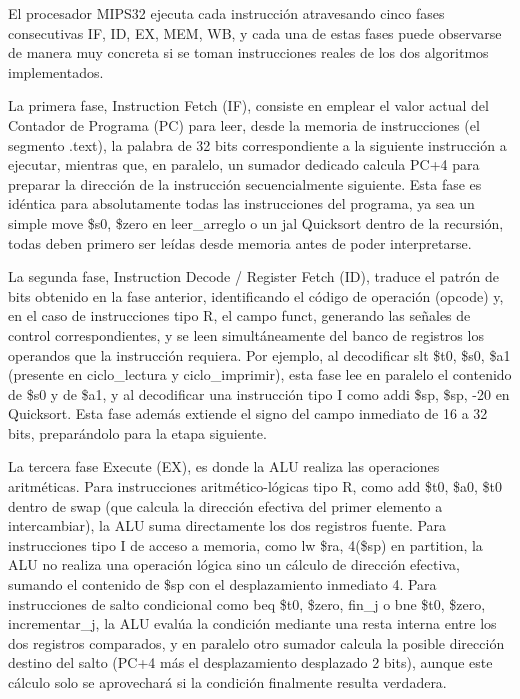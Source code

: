 \documentclass[12pt, letterpaper]{article}
\begin{document}
El procesador MIPS32 ejecuta cada instrucción atravesando cinco fases consecutivas IF, ID, EX, MEM, WB, y cada una de estas fases puede observarse de manera muy concreta si se toman instrucciones reales de los dos algoritmos implementados.

La primera fase, Instruction Fetch (IF), consiste en emplear el valor actual del Contador de Programa (PC) para leer, desde la memoria de instrucciones (el segmento .text), la palabra de 32 bits correspondiente a la siguiente instrucción a ejecutar, mientras que, en paralelo, un sumador dedicado calcula PC+4 para preparar la dirección de la instrucción secuencialmente siguiente. Esta fase es idéntica para absolutamente todas las instrucciones del programa, ya sea un simple move \$s0, \$zero en leer\_arreglo o un jal Quicksort dentro de la recursión, todas deben primero ser leídas desde memoria antes de poder interpretarse.

La segunda fase, Instruction Decode / Register Fetch (ID), traduce el patrón de bits obtenido en la fase anterior, identificando el código de operación (opcode) y, en el caso de instrucciones tipo R, el campo funct, generando las señales de control correspondientes, y se leen simultáneamente del banco de registros los operandos que la instrucción requiera. Por ejemplo, al decodificar slt \$t0, \$s0, \$a1 (presente en ciclo\_lectura y ciclo\_imprimir), esta fase lee en paralelo el contenido de \$s0 y de \$a1, y al decodificar una instrucción tipo I como addi \$sp, \$sp, -20 en Quicksort. Esta fase además extiende el signo del campo inmediato de 16 a 32 bits, preparándolo para la etapa siguiente.

La tercera fase Execute (EX), es donde la ALU realiza las operaciones aritméticas. Para instrucciones aritmético-lógicas tipo R, como add \$t0, \$a0, \$t0 dentro de swap (que calcula la dirección efectiva del primer elemento a intercambiar), la ALU suma directamente los dos registros fuente. Para instrucciones tipo I de acceso a memoria, como lw \$ra, 4(\$sp) en partition, la ALU no realiza una operación lógica sino un cálculo de dirección efectiva, sumando el contenido de \$sp con el desplazamiento inmediato 4. Para instrucciones de salto condicional como beq \$t0, \$zero, fin\_j o bne \$t0, \$zero, incrementar\_j, la ALU evalúa la condición mediante una resta interna entre los dos registros comparados, y en paralelo otro sumador calcula la posible dirección destino del salto (PC+4 más el desplazamiento desplazado 2 bits), aunque este cálculo solo se aprovechará si la condición finalmente resulta verdadera.
\end{document}
